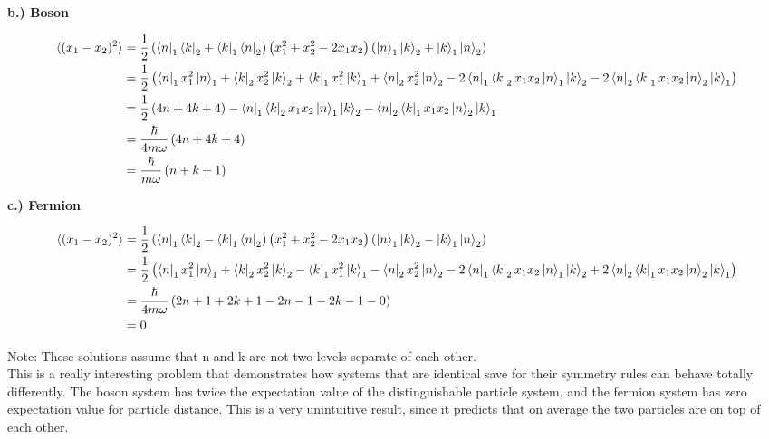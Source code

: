 \documentclass[10pt]{article} %
\begin{document}
\textbf{b.) Boson}

\begin{align*}
  \braket{(x_1-x_2)^2} &=
  \frac{1}{2}\left(\bra{n}_1\bra{k}_2 + \bra{k}_1\bra{n}_2\right)
  \left(x_1^2 + x_2^2 - 2x_1x_2\right)
  \left(\ket{n}_1\ket{k}_2 + \ket{k}_1\ket{n}_2\right)\\
  &= \frac{1}{2}\left(
  \bra{n}_1x_1^2\ket{n}_1 + \bra{k}_2x_2^2\ket{k}_2
  + \bra{k}_1x_1^2\ket{k}_1 + \bra{n}_2x_2^2\ket{n}_2
  - 2\bra{n}_1\bra{k}_2x_1x_2\ket{n}_1\ket{k}_2 - 2\bra{n}_2\bra{k}_1x_1x_2\ket{n}_2\ket{k}_1\right)\\
  &= \frac{1}{2}\left(4n + 4k + 4\right)
  - \bra{n}_1\bra{k}_2x_1x_2\ket{n}_1\ket{k}_2 - \bra{n}_2\bra{k}_1x_1x_2\ket{n}_2\ket{k}_1\\
  &= \frac{\hbar}{4m\omega}\left(4n + 4k + 4\right)\\
  &= \frac{\hbar}{m\omega}\left(n + k + 1\right)\\
\end{align*}

\textbf{c.) Fermion}

\begin{align*}
  \braket{(x_1-x_2)^2} &=
  \frac{1}{2}\left(\bra{n}_1\bra{k}_2 - \bra{k}_1\bra{n}_2\right)
  \left(x_1^2 + x_2^2 - 2x_1x_2\right)
  \left(\ket{n}_1\ket{k}_2 - \ket{k}_1\ket{n}_2\right)\\
  &= \frac{1}{2}\left(
  \bra{n}_1x_1^2\ket{n}_1 + \bra{k}_2x_2^2\ket{k}_2
  - \bra{k}_1x_1^2\ket{k}_1 - \bra{n}_2x_2^2\ket{n}_2
  - 2\bra{n}_1\bra{k}_2x_1x_2\ket{n}_1\ket{k}_2 + 2\bra{n}_2\bra{k}_1x_1x_2\ket{n}_2\ket{k}_1\right)\\
  &= \frac{\hbar}{4m\omega}\left(2n+1 + 2k+1 - 2n-1 - 2k-1 - 0\right)\\
  &= 0\\
\end{align*}

Note: These solutions assume that n and k are not two levels separate of each other.\\

This is a really interesting problem that demonstrates how systems that are identical save
for their symmetry rules can behave totally differently. The boson system has twice the expectation
value of the distinguishable particle system, and the fermion system has zero expectation value
for particle distance. This is a very unintuitive result, since it predicts that on average the
two particles are on top of each other.\\
\end{document}

